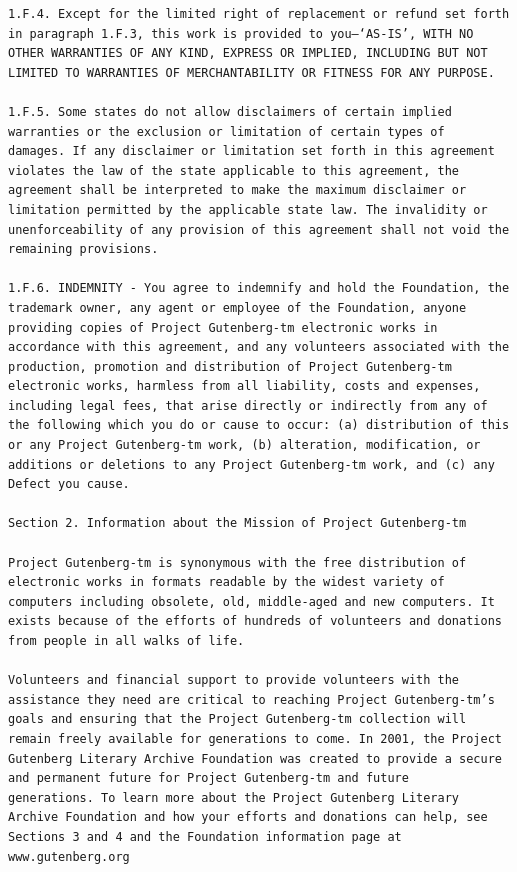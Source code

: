 \documentclass[11pt,oneside]{book}
\begin{document}
\begin{verbatim}
1.F.4. Except for the limited right of replacement or refund set forth
in paragraph 1.F.3, this work is provided to you—‘AS-IS’, WITH NO
OTHER WARRANTIES OF ANY KIND, EXPRESS OR IMPLIED, INCLUDING BUT NOT
LIMITED TO WARRANTIES OF MERCHANTABILITY OR FITNESS FOR ANY PURPOSE.

1.F.5. Some states do not allow disclaimers of certain implied
warranties or the exclusion or limitation of certain types of
damages. If any disclaimer or limitation set forth in this agreement
violates the law of the state applicable to this agreement, the
agreement shall be interpreted to make the maximum disclaimer or
limitation permitted by the applicable state law. The invalidity or
unenforceability of any provision of this agreement shall not void the
remaining provisions.

1.F.6. INDEMNITY - You agree to indemnify and hold the Foundation, the
trademark owner, any agent or employee of the Foundation, anyone
providing copies of Project Gutenberg-tm electronic works in
accordance with this agreement, and any volunteers associated with the
production, promotion and distribution of Project Gutenberg-tm
electronic works, harmless from all liability, costs and expenses,
including legal fees, that arise directly or indirectly from any of
the following which you do or cause to occur: (a) distribution of this
or any Project Gutenberg-tm work, (b) alteration, modification, or
additions or deletions to any Project Gutenberg-tm work, and (c) any
Defect you cause.

Section 2. Information about the Mission of Project Gutenberg-tm

Project Gutenberg-tm is synonymous with the free distribution of
electronic works in formats readable by the widest variety of
computers including obsolete, old, middle-aged and new computers. It
exists because of the efforts of hundreds of volunteers and donations
from people in all walks of life.

Volunteers and financial support to provide volunteers with the
assistance they need are critical to reaching Project Gutenberg-tm’s
goals and ensuring that the Project Gutenberg-tm collection will
remain freely available for generations to come. In 2001, the Project
Gutenberg Literary Archive Foundation was created to provide a secure
and permanent future for Project Gutenberg-tm and future
generations. To learn more about the Project Gutenberg Literary
Archive Foundation and how your efforts and donations can help, see
Sections 3 and 4 and the Foundation information page at
www.gutenberg.org


\end{verbatim}
\end{document}
